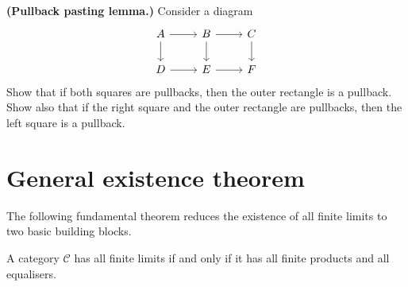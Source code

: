 \begin{exercise}\label{exer:pullback-pasting}
\textbf{(Pullback pasting lemma.)}
Consider a diagram
\[
\begin{tikzcd}
A \arrow[r] \arrow[d] & B \arrow[r] \arrow[d] & C \arrow[d] \\
D \arrow[r] & E \arrow[r] & F
\end{tikzcd}
\]
Show that if both squares are pullbacks, then the outer rectangle
is a pullback.  Show also that if the right square and the outer
rectangle are pullbacks, then the left square is a pullback.
\end{exercise}


\section{General existence theorem}\label{sec:limit-existence}

The following fundamental theorem reduces the existence of all finite
limits to two basic building blocks.

\begin{theorem}%
\label{thm:prod-eq-limits}
A category $\mathcal{C}$ has all finite limits if and only if it has all
finite products and all equalisers.
\end{theorem}

